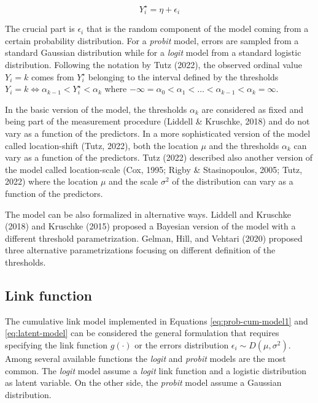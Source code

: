 \documentclass[
  man,floatsintext]{apa6}
\begin{document}
\begin{equation} 
Y^\star_i = \eta + \epsilon_i
\label{eq:latent-model}
\end{equation}

The crucial part is \(\epsilon_i\) that is the random component of the model coming from a certain probability distribution. For a \emph{probit} model, errors are sampled from a standard Gaussian distribution while for a \emph{logit} model from a standard logistic distribution. Following the notation by Tutz (2022), the observed ordinal value \(Y_i = k\) comes from \(Y^\star_i\) belonging to the interval defined by the thresholds \(Y_i = k \iff \alpha_{k - 1} < Y^\star_i < \alpha_{k}\) where \(- \infty = \alpha_0 < \alpha_1 < \dots< \alpha_{k - 1} < \alpha_k = \infty\).

In the basic version of the model, the thresholds \(\alpha_k\) are considered as fixed and being part of the measurement procedure (Liddell \& Kruschke, 2018) and do not vary as a function of the predictors. In a more sophisticated version of the model called location-shift (Tutz, 2022), both the location \(\mu\) and the thresholds \(\alpha_k\) can vary as a function of the predictors. Tutz (2022) described also another version of the model called location-scale (Cox, 1995; Rigby \& Stasinopoulos, 2005; Tutz, 2022) where the location \(\mu\) and the scale \(\sigma^2\) of the distribution can vary as a function of the predictors.

The model can be also formalized in alternative ways. Liddell and Kruschke (2018) and Kruschke (2015) proposed a Bayesian version of the model with a different threshold parametrization. Gelman, Hill, and Vehtari (2020) proposed three alternative parametrizations focusing on different definition of the thresholds.

\subsection{Link function}\label{link-function}

The cumulative link model implemented in Equations \eqref{eq:prob-cum-model1} and \eqref{eq:latent-model} can be considered the general formulation that requires specifying the link function \(g(\cdot)\) or the errors distribution \(\epsilon_i \sim D(\mu, \sigma^2)\). Among several available functions the \emph{logit} and \emph{probit} models are the most common. The \emph{logit} model assume a \emph{logit} link function and a logistic distribution as latent variable. On the other side, the \emph{probit} model assume a Gaussian distribution.
\end{document}

